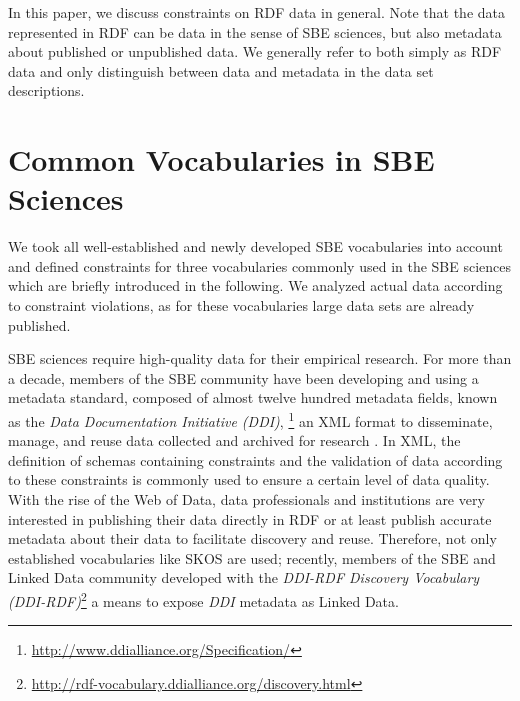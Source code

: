 \documentclass[conference]{IEEEtran}
\begin{document}
In this paper, we discuss constraints on RDF data in general. Note that the data represented in RDF can be data in the sense of SBE sciences, but also metadata about published or unpublished data. We generally refer to both simply as RDF data and only distinguish between data and metadata in the data set descriptions. 


\section{Common Vocabularies in SBE Sciences}
\label{sbe-vocabularies}

We took all well-established and newly developed SBE vocabularies into account and defined constraints for three vocabularies commonly used in the SBE sciences which are briefly introduced in the following. We analyzed actual data according to constraint violations, as for these vocabularies large data sets are already published.

SBE sciences require high-quality data for their empirical research. For more than a decade, members of the SBE community have been developing and using a
metadata standard, composed of almost twelve hundred metadata fields, known as the \emph{Data Documentation Initiative (DDI)}, \footnote{\url{http://www.ddialliance.org/Specification/}}
an XML format to disseminate, manage,
and reuse data collected and archived for research \cite{Vardigan2008}. 
In XML, the definition of schemas containing constraints and the validation of data according to these constraints is commonly used to ensure a certain level of data quality.
With the rise of the Web of Data, data professionals and institutions are very interested in publishing their data directly in RDF or at least publish accurate metadata about their data to facilitate discovery and reuse. Therefore, not only established vocabularies like SKOS are used; 
recently, members of the SBE and Linked Data community developed with the \emph{DDI-RDF Discovery Vocabulary (DDI-RDF)}\footnote{\url{http://rdf-vocabulary.ddialliance.org/discovery.html}} a means to expose \emph{DDI} metadata as Linked Data. 
\end{document}
